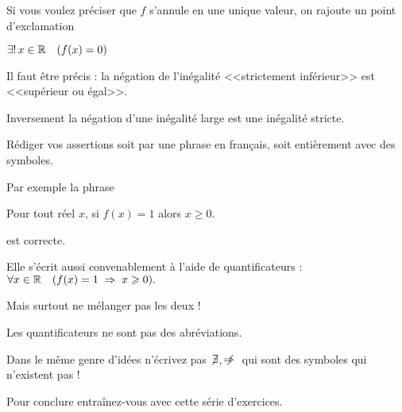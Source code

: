 Si vous voulez préciser que $f$ s'annule en une unique valeur, on rajoute un point d'exclamation 

$\exists \mathbf{!}\, x \in \Rr \quad (f(x)=0)$


\change

Il faut être précis : la négation de l'inégalité <<strictement inférieur>>
est <<supérieur ou égal>>.

Inversement la négation d'une inégalité large est une inégalité stricte.


\change

Rédiger vos assertions soit par une phrase en français, soit entièrement
avec des symboles.

Par exemple la phrase 

\og Pour tout réel $x$, si $f(x)=1$ alors $x\ge0$.\fg

est correcte.

Elle s'écrit aussi convenablement à l'aide de quantificateurs  :\\
$\forall x \in \Rr \quad (f(x)=1 \implies x \ge 0).$

Mais surtout ne mélanger pas les deux !

Les quantificateurs ne sont pas des abréviations.


\change

Dans le même genre d'idées n'écrivez pas $\not\!\exists$, $\not\!\!\!\implies$
qui sont des symboles qui n'existent pas !



\diapo


Pour conclure entraînez-vous avec cette série d'exercices.



